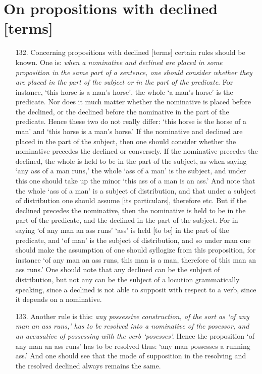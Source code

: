 \documentclass[]{article}
\begin{document}
\section{On propositions with declined [terms]}
\begin{itemize}
\item[132.] Concerning propositions with declined [terms] certain rules should be known. One is: \textit{when a nominative and declined are placed in some proposition in the same part of a sentence, one should consider whether they are placed in the part of the subject or in the part of the predicate}. For instance, `this horse is a man's horse', the whole `a man's horse' is the predicate. Nor does it much matter whether the nominative is placed before the declined, or the declined before the nominative in the part of the predicate. Hence these two do not really differ: `this horse is the horse of a man' and `this horse is a man's horse.' If the nominative and declined are placed in the part of the subject, then one should consider whether the nominative precedes the declined or conversely. If the nominative precedes the declined, the whole is held to be in the part of the subject, as when saying `any ass of a man runs,' the whole `ass of a man' is the subject, and under this one should take up the minor `this ass of a man is an ass.' And note that the whole `ass of a man' is a  subject of distribution, and that under a subject of distribution one should assume [its particulars], therefore etc. But if the declined precedes the nominative, then the nominative is held to be in the part of the predicate, and the declined in the part of the subject. For in saying `of any man an ass runs' `ass' is held [to be] in the part of the predicate, and `of man' is the subject of distribution, and so under man one should make the assumption of one should syllogize from this proposition, for instance `of any man an ass runs, this man is a man, therefore of this man an ass runs.' One should note that any declined can be the subject of distribution, but not any can be the subject of a locution grammatically speaking, since a declined is not able to supposit with respect to a verb, since it depends on a nominative. 
\item[133.] Another rule is this: \textit{any possessive construction, of the sort as `of any man an ass runs,' has to be resolved into a nominative of the posessor, and an accusative of possessing with the verb `posesses'.} Hence the proposition `of any man an ass runs' has to be resolved thus: `any man possesses a running ass.' And one should see that the mode of supposition in the resolving and the resolved declined always remains the same. 

\end{itemize}
\end{document}

